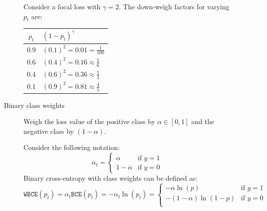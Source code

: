 \begin{description}
\begin{description}
                \begin{example}
                    Consider a focal loss with $\gamma = 2$. The down-weigh factors for varying $p_t$ are:
                    \begin{table}[H]
                        \centering
                        \footnotesize
                        \begin{tabular}{cl}
                            \toprule
                            $p_t$ & $(1-p_t)^\gamma$ \\
                            \midrule
                            $0.9$ & $(0.1)^2 = 0.01 = \frac{1}{100}$ \\ 
                            $0.6$ & $(0.4)^2 = 0.16 \approx \frac{1}{6}$ \\ 
                            $0.4$ & $(0.6)^2 = 0.36 \approx \frac{1}{3}$ \\ 
                            $0.1$ & $(0.9)^2 = 0.81 \approx \frac{4}{5}$ \\ 
                            \bottomrule
                        \end{tabular}
                    \end{table}
                \end{example}

            \item[Binary class weights] 
                Weigh the loss value of the positive class by $\alpha \in [0, 1]$ and the negative class by $(1 - \alpha)$.

                Consider the following notation:
                \[ \alpha_t = \begin{cases}
                    \alpha & \text{if $y=1$} \\
                    1-\alpha & \text{if $y=0$}
                \end{cases} \]
                Binary cross-entropy with class weights can be defined as:
                \[ 
                    \texttt{WBCE}(p_t) = 
                    \alpha_t \texttt{BCE}(p_t) = 
                    -\alpha_t \ln(p_t) =
                    \begin{cases}
                        -\alpha \ln(p) & \text{if $y=1$} \\
                        -(1-\alpha) \ln(1-p) & \text{if $y=0$} \\
                    \end{cases}
                \]


\end{description}
\end{description}
